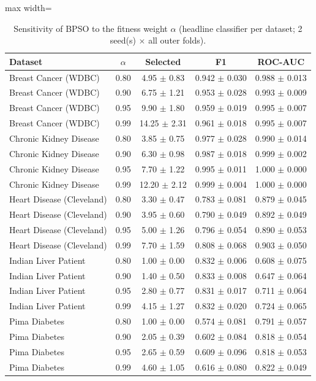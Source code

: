 \begin{table}[!t]
\centering
\caption{Sensitivity of BPSO to the fitness weight $\alpha$ (headline classifier per dataset; 2 seed(s) $\times$ all outer folds).}
\label{tab:alpha}
\footnotesize
\setlength{\tabcolsep}{4pt}
\begin{adjustbox}{max width=\linewidth}
\begin{tabular}{lcccc}
\toprule
\textbf{Dataset} & \textbf{$\alpha$} & \textbf{Selected} & \textbf{F1} & \textbf{ROC-AUC} \\
\midrule
Breast Cancer (WDBC) & 0.80 & 4.95 $\pm$ 0.83 & 0.942 $\pm$ 0.030 & 0.988 $\pm$ 0.013 \\
Breast Cancer (WDBC) & 0.90 & 6.75 $\pm$ 1.21 & 0.953 $\pm$ 0.028 & 0.993 $\pm$ 0.009 \\
Breast Cancer (WDBC) & 0.95 & 9.90 $\pm$ 1.80 & 0.959 $\pm$ 0.019 & 0.995 $\pm$ 0.007 \\
Breast Cancer (WDBC) & 0.99 & 14.25 $\pm$ 2.31 & 0.961 $\pm$ 0.018 & 0.995 $\pm$ 0.007 \\
Chronic Kidney Disease & 0.80 & 3.85 $\pm$ 0.75 & 0.977 $\pm$ 0.028 & 0.990 $\pm$ 0.014 \\
Chronic Kidney Disease & 0.90 & 6.30 $\pm$ 0.98 & 0.987 $\pm$ 0.018 & 0.999 $\pm$ 0.002 \\
Chronic Kidney Disease & 0.95 & 7.70 $\pm$ 1.22 & 0.995 $\pm$ 0.011 & 1.000 $\pm$ 0.000 \\
Chronic Kidney Disease & 0.99 & 12.20 $\pm$ 2.12 & 0.999 $\pm$ 0.004 & 1.000 $\pm$ 0.000 \\
Heart Disease (Cleveland) & 0.80 & 3.30 $\pm$ 0.47 & 0.783 $\pm$ 0.081 & 0.879 $\pm$ 0.045 \\
Heart Disease (Cleveland) & 0.90 & 3.95 $\pm$ 0.60 & 0.790 $\pm$ 0.049 & 0.892 $\pm$ 0.049 \\
Heart Disease (Cleveland) & 0.95 & 5.00 $\pm$ 1.26 & 0.796 $\pm$ 0.054 & 0.890 $\pm$ 0.053 \\
Heart Disease (Cleveland) & 0.99 & 7.70 $\pm$ 1.59 & 0.808 $\pm$ 0.068 & 0.903 $\pm$ 0.050 \\
Indian Liver Patient & 0.80 & 1.00 $\pm$ 0.00 & 0.832 $\pm$ 0.006 & 0.608 $\pm$ 0.075 \\
Indian Liver Patient & 0.90 & 1.40 $\pm$ 0.50 & 0.833 $\pm$ 0.008 & 0.647 $\pm$ 0.064 \\
Indian Liver Patient & 0.95 & 2.80 $\pm$ 0.77 & 0.831 $\pm$ 0.017 & 0.711 $\pm$ 0.064 \\
Indian Liver Patient & 0.99 & 4.15 $\pm$ 1.27 & 0.832 $\pm$ 0.020 & 0.724 $\pm$ 0.065 \\
Pima Diabetes & 0.80 & 1.00 $\pm$ 0.00 & 0.574 $\pm$ 0.081 & 0.791 $\pm$ 0.057 \\
Pima Diabetes & 0.90 & 2.05 $\pm$ 0.39 & 0.602 $\pm$ 0.084 & 0.818 $\pm$ 0.054 \\
Pima Diabetes & 0.95 & 2.65 $\pm$ 0.59 & 0.609 $\pm$ 0.096 & 0.818 $\pm$ 0.053 \\
Pima Diabetes & 0.99 & 4.60 $\pm$ 1.05 & 0.616 $\pm$ 0.080 & 0.822 $\pm$ 0.049 \\
\bottomrule
\end{tabular}
\end{adjustbox}
\end{table}
